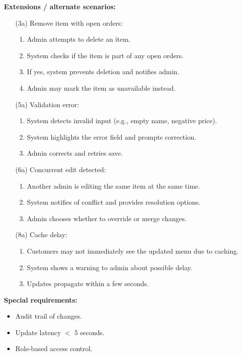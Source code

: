 \documentclass{article}
\begin{document}
\textbf{Extensions / alternate scenarios:}
\begin{itemize}
    \item[(3a)] Remove item with open orders:
    \begin{enumerate}
        \item Admin attempts to delete an item.
        \item System checks if the item is part of any open orders.
        \item If yes, system prevents deletion and notifies admin.
        \item Admin may mark the item as unavailable instead.
    \end{enumerate}

    \item[(5a)] Validation error:
    \begin{enumerate}
        \item System detects invalid input (e.g., empty name, negative price).
        \item System highlights the error field and prompts correction.
        \item Admin corrects and retries save.
    \end{enumerate}

    \item[(6a)] Concurrent edit detected:
    \begin{enumerate}
        \item Another admin is editing the same item at the same time.
        \item System notifies of conflict and provides resolution options.
        \item Admin chooses whether to override or merge changes.
    \end{enumerate}

    \item[(8a)] Cache delay:
    \begin{enumerate}
        \item Customers may not immediately see the updated menu due to caching.
        \item System shows a warning to admin about possible delay.
        \item Updates propagate within a few seconds.
    \end{enumerate}
\end{itemize}


\textbf{Special requirements:}
\begin{itemize}
    \item Audit trail of changes.
    \item Update latency $<$ 5 seconds.
    \item Role-based access control.
\end{itemize}
\end{document}
